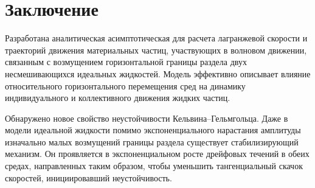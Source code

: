 \section{Заключение}

Разработана аналитическая асимптотическая для расчета лагранжевой скорости и траекторий движения материальных частиц, участвующих в волновом движении, связанным с возмущением горизонтальной границы раздела двух несмешивающихся идеальных жидкостей. Модель эффективно описывает влияние относительного горизонтального перемещения сред на динамику индивидуального и коллективного движения жидких частиц. 

Обнаружено новое свойство неустойчивости Кельвина--Гельмгольца. Даже в модели идеальной жидкости помимо экспоненциального нарастания амплитуды изначально малых возмущений границы раздела существует стабилизирующий механизм. Он проявляется в экспоненциальном росте дрейфовых течений в обеих средах, направленных таким образом, чтобы уменьшить тангенциальный скачок скоростей, инициировавший неустойчивость.